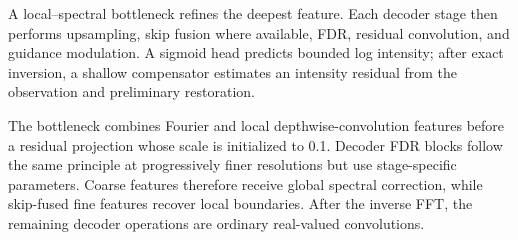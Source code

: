 \documentclass[conference]{IEEEtran}
\begin{document}
A local--spectral bottleneck refines the deepest feature. Each decoder stage then performs upsampling, skip fusion where available, FDR, residual convolution, and guidance modulation. A sigmoid head predicts bounded log intensity; after exact inversion, a shallow compensator estimates an intensity residual from the observation and preliminary restoration.

The bottleneck combines Fourier and local depthwise-convolution features before a residual projection whose scale is initialized to 0.1. Decoder FDR blocks follow the same principle at progressively finer resolutions but use stage-specific parameters. Coarse features therefore receive global spectral correction, while skip-fused fine features recover local boundaries. After the inverse FFT, the remaining decoder operations are ordinary real-valued convolutions.
\end{document}
